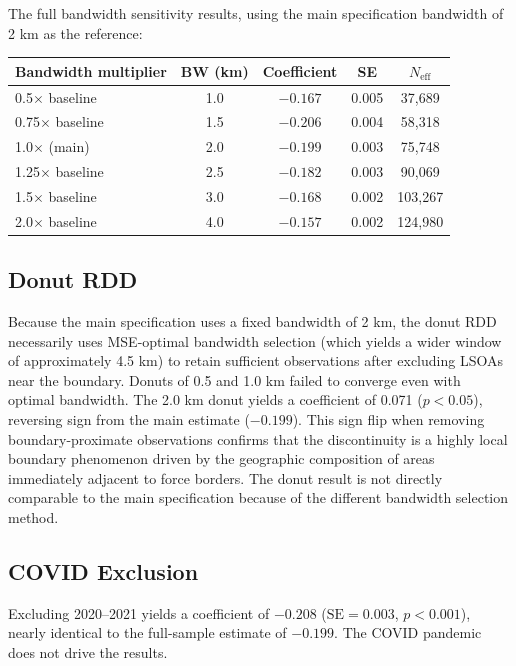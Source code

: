 \documentclass[12pt]{article}
\begin{document}
The full bandwidth sensitivity results, using the main specification bandwidth of 2 km as the reference:

\begin{center}
\begin{tabular}{lcccc}
\toprule
Bandwidth multiplier & BW (km) & Coefficient & SE & $N_{\text{eff}}$ \\
\midrule
0.5$\times$ baseline & 1.0 & $-0.167$ & 0.005 & 37,689 \\
0.75$\times$ baseline & 1.5 & $-0.206$ & 0.004 & 58,318 \\
1.0$\times$ (main) & 2.0 & $-0.199$ & 0.003 & 75,748 \\
1.25$\times$ baseline & 2.5 & $-0.182$ & 0.003 & 90,069 \\
1.5$\times$ baseline & 3.0 & $-0.168$ & 0.002 & 103,267 \\
2.0$\times$ baseline & 4.0 & $-0.157$ & 0.002 & 124,980 \\
\bottomrule
\end{tabular}
\end{center}

\subsection{Donut RDD}

Because the main specification uses a fixed bandwidth of 2 km, the donut RDD necessarily uses MSE-optimal bandwidth selection (which yields a wider window of approximately 4.5 km) to retain sufficient observations after excluding LSOAs near the boundary. Donuts of 0.5 and 1.0 km failed to converge even with optimal bandwidth. The 2.0 km donut yields a coefficient of 0.071 ($p < 0.05$), reversing sign from the main estimate ($-0.199$). This sign flip when removing boundary-proximate observations confirms that the discontinuity is a highly local boundary phenomenon driven by the geographic composition of areas immediately adjacent to force borders. The donut result is not directly comparable to the main specification because of the different bandwidth selection method.

\subsection{COVID Exclusion}

Excluding 2020--2021 yields a coefficient of $-0.208$ ($\text{SE} = 0.003$, $p < 0.001$), nearly identical to the full-sample estimate of $-0.199$. The COVID pandemic does not drive the results.
\end{document}

